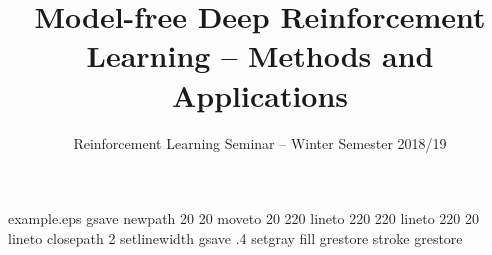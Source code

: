 %
%
%
%
%
\begin{filecontents*}{example.eps}
    gsave
    newpath
    20 20 moveto
    20 220 lineto
    220 220 lineto
    220 20 lineto
    closepath
    2 setlinewidth
    gsave
    .4 setgray fill
    grestore
    stroke
    grestore
\end{filecontents*}
%
\RequirePackage{fix-cm}
%
\documentclass{svjour3}                     %
%
\smartqed  %
%
\usepackage{graphicx}
\usepackage{amssymb}
\usepackage{amsmath}
%
%
%
%
%

\newcommand{\argmax}[1]{\underset{#1}{\operatorname{arg}\,\operatorname{max}}\;}



    \title{Model-free Deep Reinforcement Learning -- Methods and Applications%
    }
    \subtitle{Reinforcement Learning Seminar -- Winter Semester 2018/19}


